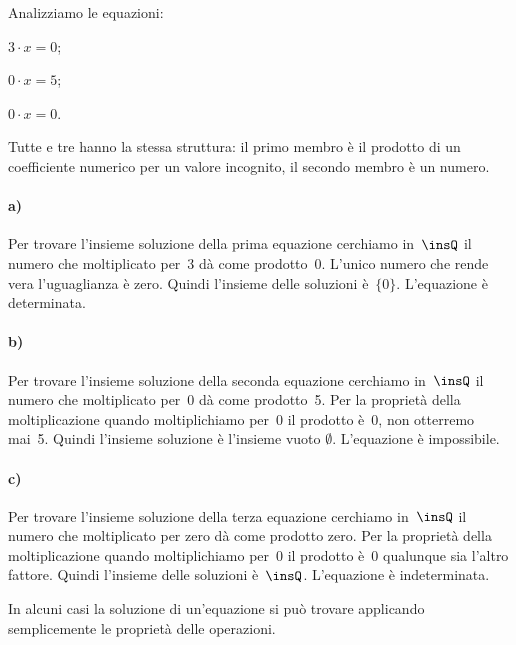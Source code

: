 \begin{exrig}
 \begin{esempio}
 Analizziamo le equazioni:
\begin{multicols}{3}
 \begin{enumeratea}
 \item $3\cdot x=0$;
 \item $0\cdot x=5$;
 \item $0\cdot x=0$.
\end{enumeratea}
\end{multicols}

Tutte e tre hanno la stessa struttura: il primo membro è il prodotto
di un coefficiente numerico per un valore incognito, il secondo membro
è un numero.

\paragraph{a)} Per trovare l'insieme soluzione della prima equazione cerchiamo in~$\insQ$ il
numero che moltiplicato per~3 dà come prodotto~0. L'unico numero che rende vera
l'uguaglianza è zero. Quindi l'insieme delle soluzioni è~$\{0\}$. L'equazione è
determinata.

\paragraph{b)} Per trovare l'insieme soluzione della seconda equazione cerchiamo in~$\insQ$ il
numero che moltiplicato per~0 dà come prodotto~5. Per la proprietà
della moltiplicazione quando moltiplichiamo per~0 il prodotto è~0,
non otterremo mai~5. Quindi l'insieme soluzione è
l'insieme vuoto $\emptyset$. L'equazione è
impossibile.

\paragraph{c)} Per trovare l'insieme soluzione della terza equazione cerchiamo in~$\insQ$ il
numero che moltiplicato per zero dà come prodotto zero. Per la
proprietà della moltiplicazione quando moltiplichiamo per~0 il
prodotto è~0 qualunque sia l'altro fattore. Quindi
l'insieme delle soluzioni è~$\insQ$. L'equazione è
indeterminata.
 \end{esempio}
\end{exrig}

In alcuni casi la soluzione di un'equazione si può
trovare applicando semplicemente le proprietà delle operazioni.

